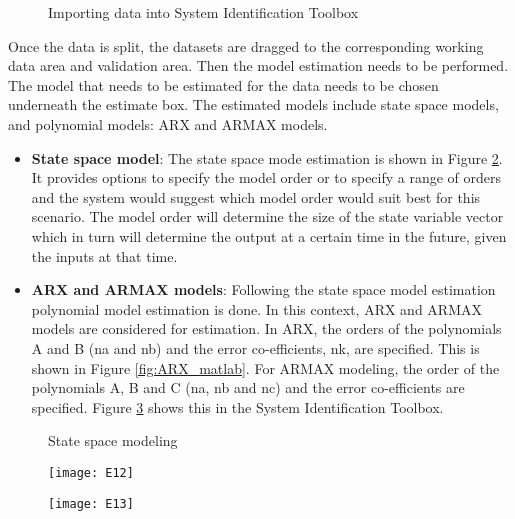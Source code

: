\documentclass[article,type=msc,colorback,12pt,accentcolor=tud8b,table]{tudthesis}
\begin{document}
    \begin{figure}[h]
    	\begin{center}
    		\makebox[\textwidth]{\texttt{[image: D6]}}
    	\end{center}
    	\caption{Importing data into System Identification Toolbox}
    	\label{fig:dataset_import}
    \end{figure}	
 Once the data is split, the datasets are dragged to the corresponding working data area and validation area. Then the model estimation needs to be performed. The model that needs to be estimated for the data needs to be chosen underneath the estimate box. The estimated models include state space models, and polynomial models: ARX and ARMAX models.
	\begin{itemize}
		\item{\textbf{State space model}:} The state space mode estimation is shown in Figure \ref{fig:state_space_matlab}. It provides options to specify the model order or to specify a range of orders and the system would suggest which model order would suit best for this scenario. The model order will determine the size of the state variable vector which in turn will determine the output at a certain time in the future, given the inputs at that time.
		
		\item{\textbf{ARX and ARMAX models}:} 	Following the state space model estimation polynomial model estimation is done. In this context, ARX and ARMAX models are considered for estimation. In ARX, the orders of the polynomials A and B (na and nb) and the error co-efficients, nk, are specified. This is shown in Figure \ref{fig:ARX_matlab}. For ARMAX modeling, the order of the polynomials A, B and C (na, nb and nc) and the error co-efficients are specified. Figure \ref{fig:ARMAX_matlab} shows this in the System Identification Toolbox.
		
	\end{itemize}
	
	\begin{figure}[H]
		\begin{center}
			\makebox[\textwidth]{\texttt{[image: E11]}}
		\end{center}
		\caption{State space modeling}
		\label{fig:state_space_matlab}
	\end{figure}
	
	\begin{figure}[H]
		\centering
		\begin{minipage}{.5\textwidth}
			\centering
			\texttt{[image: E12]}
			\label{fig:ARX_matlab}
			
		\end{minipage}%
		\begin{minipage}{.5\textwidth}
			\centering
			\texttt{[image: E13]}
			\label{fig:ARMAX_matlab}
		\end{minipage}
	\end{figure}
 
\end{document}
